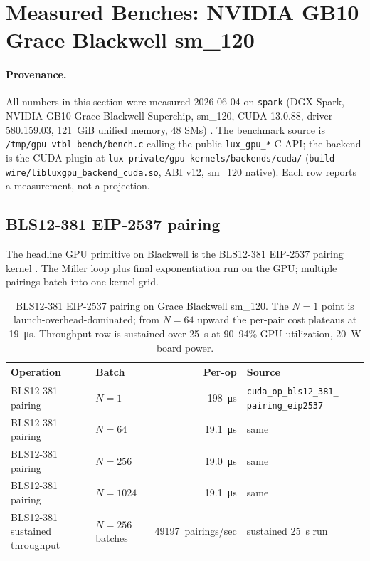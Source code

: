 \section{Measured Benches: NVIDIA GB10 Grace Blackwell sm\_120}
\label{sec:measured}

\paragraph{Provenance.} All numbers in this section were measured
2026-06-04 on \texttt{spark} (DGX Spark, NVIDIA GB10 Grace
Blackwell Superchip, sm\_120, CUDA 13.0.88, driver 580.159.03,
\SI{121}{GiB} unified memory, 48 SMs)
\cite{blackwell2024,gracehopper2023}. The benchmark source is
\texttt{/tmp/gpu-vtbl-bench/bench.c} calling the public
\texttt{lux\_gpu\_*} C API; the backend is the CUDA
plugin at \texttt{lux-private/gpu-kernels/backends/cuda/}
(\texttt{build-wire/libluxgpu\_backend\_cuda.so}, ABI v12,
sm\_120 native). Each row reports a measurement, not a
projection.

\subsection{BLS12-381 EIP-2537 pairing}

The headline GPU primitive on Blackwell is the BLS12-381
EIP-2537 pairing kernel \cite{eip2537,bls12381}. The Miller loop
plus final exponentiation run on the GPU; multiple pairings batch
into one kernel grid.

\begin{table}[h]
\centering
\small
\begin{tabular}{@{}p{3.3cm}p{2.4cm}rp{4cm}@{}}
\toprule
\textbf{Operation} & \textbf{Batch} & \textbf{Per-op}
  & \textbf{Source} \\
\midrule
BLS12-381 pairing & $N{=}1$ & \SI{198}{\micro\second}
  & \texttt{cuda\_op\_bls12\_381\_} \texttt{pairing\_eip2537} \\
BLS12-381 pairing & $N{=}64$ & \SI{19.1}{\micro\second}
  & same \\
BLS12-381 pairing & $N{=}256$ & \SI{19.0}{\micro\second}
  & same \\
BLS12-381 pairing & $N{=}1024$ & \SI{19.1}{\micro\second}
  & same \\
BLS12-381 sustained
  throughput & $N{=}256$ batches & \num{49197}~pairings/sec
  & sustained \SI{25}{\second} run \\
\bottomrule
\end{tabular}
\caption{BLS12-381 EIP-2537 pairing on Grace Blackwell sm\_120.
The $N{=}1$ point is launch-overhead-dominated; from $N{=}64$
upward the per-pair cost plateaus at \SI{19}{\micro\second}.
Throughput row is sustained over \SI{25}{\second} at 90--94\%
GPU utilization, \SI{20}{\watt} board power.}
\label{tab:bls-measured}
\end{table}

